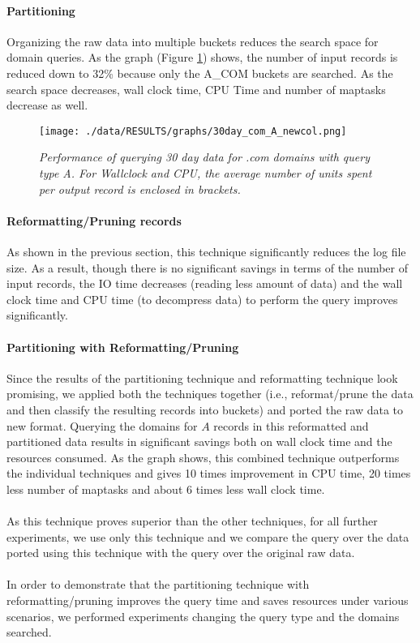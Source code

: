 \documentclass[11pt,a4paper]{article}
\begin{document}
\paragraph{Partitioning} Organizing the raw data into multiple buckets reduces the search space for domain queries. As the graph (Figure \ref{comafigure}) shows, the number of input records is reduced down to 32\% because only the A\_COM buckets are searched. As the search space decreases, wall clock time, CPU Time and number of maptasks decrease as well.

\begin{figure}[H] 
\centering
\texttt{[image: ./data/RESULTS/graphs/30day\_com\_A\_newcol.png]}
\caption {\textit{Performance of querying 30 day data for .com domains with query type A. For Wallclock and CPU, the average number of units spent per output record is enclosed in brackets.}}
\label{comafigure}
\end{figure}

\paragraph{Reformatting/Pruning records} As shown in the previous section, this technique significantly reduces the log file size. As a result, though there is no significant savings in terms of the number of input records, the IO time decreases (reading less amount of data) and the wall clock time and CPU time (to decompress data) to perform the query improves significantly.

\paragraph{Partitioning with Reformatting/Pruning} Since the results of the partitioning technique and reformatting technique look promising, we applied both the techniques together (i.e., reformat/prune the data and then classify the resulting records into buckets) and ported the raw data to new format. Querying the domains for $A$ records in this reformatted and partitioned data results in significant savings both on wall clock time and the resources consumed. As the graph shows, this combined technique outperforms the individual techniques and gives 10 times improvement in CPU time, 20 times less number of maptasks and about 6 times less wall clock time.
\\\\
As this technique proves superior than the other techniques, for all further experiments, we use only this technique and we compare the query over the data ported using this technique with the query over the original raw data.
\\\\
In order to demonstrate that the partitioning technique with reformatting/pruning improves the query time and saves resources under various scenarios, we performed experiments changing the query type and the domains searched.
\end{document}

